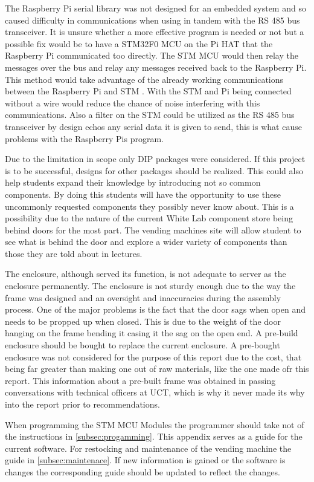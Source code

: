\documentclass[a4paper,11pt]{article}
\numberwithin{figure}{section}
\numberwithin{table}{section}
\begin{document}
The Raspberry Pi serial library was not designed for an embedded system and so caused difficulty in communications when using in tandem with the RS 485 bus transceiver. It is unsure whether a more effective program is needed or not but a possible fix would be to have a STM32F0 MCU on the Pi HAT that the Raspberry Pi communicated too directly. The STM MCU would then relay the messages over the bus and relay any messages received back to the Raspberry Pi. This method would take advantage of the already working communications between the Raspberry Pi and STM . With the STM and Pi being connected without a wire would reduce the chance of noise interfering with this communications. Also a filter on the STM could be utilized as the RS 485 bus transceiver by design echos any serial data it is given to send, this is what cause problems with the Raspberry Pis program.

Due to the limitation in scope only DIP packages were considered. If this project is to be successful, designs for other packages should be realized. This could also help students expand their knowledge by introducing not so common components. By doing this students will have the opportunity to use these uncommonly requested components they possibly never know about. This is a possibility due to the nature of the current White Lab component store being behind doors for the most part. The vending machines site will allow student to see what is behind the door and explore a wider variety of components than those they are told about in lectures.

The enclosure, although served its function, is not adequate to server as the enclosure permanently. The enclosure is not sturdy enough due to the way the frame was designed and an oversight and inaccuracies during the assembly process. One of the major problems is the fact that the door sags when open and needs to be propped up when closed. This is due to the weight of the door hanging on the frame bending it casing it the sag on the open end. A pre-build enclosure should be bought to replace the current enclosure. A pre-bought enclosure was not considered for the purpose of this report due to the cost, that being far greater than making one out of raw materials, like the one made ofr this report. This information about a pre-built frame was obtained in passing conversations with technical officers at UCT, which is why it never made its why into the report prior to recommendations.

When programming the STM MCU Modules the programmer should take not of the instructions in \autoref{subsec:progamming}. This appendix serves as a guide for the current software. For restocking and maintenance of the vending machine the guide in \autoref{subsec:maintenace}. If new information is gained or the software is changes the corresponding guide should be updated to reflect the changes.
\end{document}
